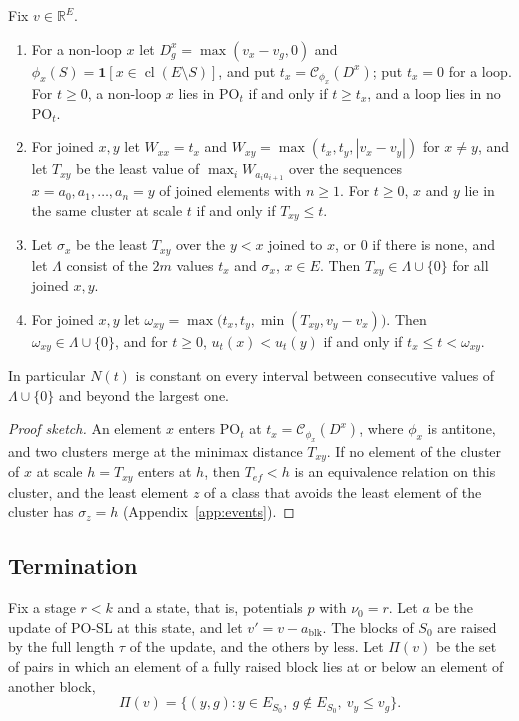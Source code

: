 \documentclass[runningheads,envcountsame]{llncs}
\newcommand{\R}{\mathbb R}
\newcommand{\cl}{\operatorname{cl}}
\newcommand{\blk}{\operatorname{blk}}
\newcommand{\PO}{\mathrm{PO}}
\newcommand{\CC}{\mathcal C}
\begin{document}
\begin{lemma}
\label{lem:events}
Fix $v\in\R^{E}$.
\begin{enumerate}
  \item For a non-loop $x$ let $D^{x}_g=\max(v_x-v_g,0)$ and
        $\phi_x(S)=\mathbf 1[x\in\cl(E\setminus S)]$, and put
        $t_x=\CC_{\phi_x}(D^{x})$; put $t_x=0$ for a loop.  For $t\ge0$, a non-loop
        $x$ lies in $\PO_t$ if and only if $t\ge t_x$, and a loop lies in no
        $\PO_t$.
  \item For joined $x,y$ let $W_{xx}=t_x$ and $W_{xy}=\max(t_x,t_y,|v_x-v_y|)$ for
        $x\ne y$, and let $T_{xy}$ be the least value of
        $\max_iW_{a_ia_{i+1}}$ over the sequences $x=a_0,a_1,\ldots,a_n=y$ of joined
        elements with $n\ge1$.  For $t\ge0$, $x$ and $y$ lie in the same cluster at scale
        $t$ if and only if $T_{xy}\le t$.
  \item Let $\sigma_x$ be the least $T_{xy}$ over the $y<x$ joined to $x$, or
        $0$ if there is none, and let $\Lambda$ consist of the $2m$ values
        $t_x$ and $\sigma_x$, $x\in E$.  Then $T_{xy}\in\Lambda\cup\{0\}$ for all
        joined $x,y$.
  \item For joined $x,y$ let
        $\omega_{xy}=\max\bigl(t_x,t_y,\min(T_{xy},v_y-v_x)\bigr)$.  Then
        $\omega_{xy}\in\Lambda\cup\{0\}$, and for $t\ge0$, $u_t(x)<u_t(y)$ if and
        only if $t_x\le t<\omega_{xy}$.
\end{enumerate}
In particular $N(t)$ is constant on every interval between consecutive values of
$\Lambda\cup\{0\}$ and beyond the largest one.
\end{lemma}

\begin{proof}[Proof sketch]
An element $x$ enters $\PO_t$ at $t_x=\CC_{\phi_x}(D^{x})$, where $\phi_x$ is
antitone, and two clusters merge at the minimax distance $T_{xy}$.
If no element of the cluster of $x$ at scale $h=T_{xy}$ enters at $h$, then
$T_{ef}<h$ is an equivalence relation on this cluster, and the least element $z$ of
a class that avoids the least element of the cluster has $\sigma_z=h$
(Appendix~\ref{app:events}).
\end{proof}

\subsection{Termination}
\label{sec:term}

Fix a stage $r<k$ and a state, that is, potentials $p$ with $\nu_0=r$.  Let $a$ be
the update of PO-SL at this state, and let $v'=v-a_{\blk}$.  The blocks of $S_0$ are raised by the full
length $\tau$ of the update, and the others by less.  Let $\Pi(v)$ be the set of pairs in which an element of a fully raised block
lies at or below an element of another block,
\[
  \Pi(v)=\bigl\{(y,g):y\in E_{S_0},\ g\notin E_{S_0},\ v_y\le v_g\bigr\}.
\]
\end{document}

